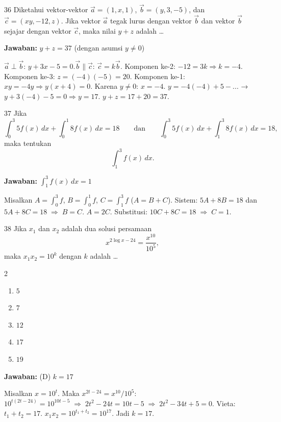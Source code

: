 \documentclass[11pt]{article}
\newcommand{\jawaban}[1]{%
  \noindent\colorbox{gold!30}{\parbox{\dimexpr\linewidth-2\fboxsep\relax}{%
    \textbf{Jawaban:} #1}}\par\smallskip}
\newenvironment{pilB}{%
  \par\smallskip\begin{multicols}{2}
  \begin{enumerate}[label=(\Alph*),leftmargin=*,itemsep=1pt,topsep=3pt]}%
  {\end{enumerate}\end{multicols}}
\begin{document}
\begin{soal}{36}
Diketahui vektor-vektor $\vec{a}=(1,x,1)$, $\vec{b}=(y,3,-5)$,
dan $\vec{c}=(xy,-12,z)$. Jika vektor $\vec{a}$ tegak lurus
dengan vektor $\vec{b}$ dan vektor $\vec{b}$ sejajar dengan
vektor $\vec{c}$, maka nilai $y+z$ adalah \ldots
\end{soal}
\begin{pembox}
\jawaban{$y+z=37$ (dengan asumsi $y\neq0$)}
$\vec{a}\perp\vec{b}$: $y+3x-5=0$.\quad $\vec{b}\parallel\vec{c}$: $\vec{c}=k\vec{b}$.
Komponen ke-2: $-12=3k\Rightarrow k=-4$.
Komponen ke-3: $z=(-4)(-5)=20$.
Komponen ke-1: $xy=-4y\Rightarrow y(x+4)=0$. Karena $y\neq0$: $x=-4$.
$y=-4(-4)+5-... $ → $y+3(-4)-5=0\Rightarrow y=17$.
$y+z=17+20=37$.
\end{pembox}

\begin{soal}{37}
Jika
\[
  \int_0^3 5f(x)\,dx+\int_0^1 8f(x)\,dx=18
  \qquad\text{dan}\qquad
  \int_0^3 5f(x)\,dx+\int_1^3 8f(x)\,dx=18,
\]
maka tentukan
\[
  \int_1^3 f(x)\,dx.
\]
\end{soal}
\begin{pembox}
\jawaban{$\displaystyle\int_1^3 f(x)\,dx=1$}
Misalkan $A=\int_0^3 f$, $B=\int_0^1 f$, $C=\int_1^3 f$ ($A=B+C$).
Sistem: $5A+8B=18$ dan $5A+8C=18\;\Rightarrow\;B=C$.
$A=2C$. Substitusi: $10C+8C=18\;\Rightarrow\;C=1$.
\end{pembox}

\begin{soal}{38}
Jika $x_1$ dan $x_2$ adalah dua solusi persamaan
\[
  x^{2\log x-24}=\frac{x^{10}}{10^5},
\]
maka $x_1 x_2=10^k$ dengan $k$ adalah \ldots
\begin{pilB}
  \item $5$ \item $7$ \item $12$ \item $17$ \item $19$
\end{pilB}
\end{soal}
\begin{pembox}
\jawaban{(D) $k=17$}
Misalkan $x=10^t$. Maka $x^{2t-24}=x^{10}/10^5$:
$10^{t(2t-24)}=10^{10t-5}\;\Rightarrow\;2t^2-24t=10t-5\;\Rightarrow\;2t^2-34t+5=0$.
Vieta: $t_1+t_2=17$. $x_1x_2=10^{t_1+t_2}=10^{17}$. Jadi $k=17$.
\end{pembox}
\end{document}
